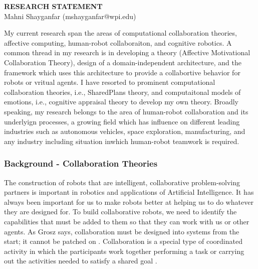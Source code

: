 \documentclass[a4paper, 10pt]{article}
\begin{document}
\thispagestyle{fancy}

\lhead{}
\rhead{}

\renewcommand{\headrulewidth}{0pt} 
\renewcommand{\footrulewidth}{0pt} 

\pagestyle{fancy}

\rhead{\textcolor{gray}{\thepage/\totalpages{}}}

\begin{small}

\begin{center}
{\LARGE \bf RESEARCH STATEMENT}\\
\vspace*{0.1cm}
{\normalsize Mahni Shayganfar (mshayganfar@wpi.edu)}
\end{center}

My current research span the areas of computational collaboration theories,
affective computing, human-robot collaboraiton, and cognitive robotics. A
common thread in my research is in developing a theory (Affective Motivational
Collaboration Theory), design of a domain-independent architecture, and the
framework which uses this architecture to provide a collabortive behavior for
robots or vritual agents. I have resorted to prominent computational
collaboration theories, i.e., SharedPlans theory, and computaitonal models of
emotions, i.e., cognitive appraisal theory to develop my own theory. Broadly
speaking, my research belongs to the area of human-robot collaboration and its
underlyign processes, a growing field which has influence on different leading
industries such as autonomous vehicles, space exploration, manufacturing, and
any industry including situation inwhich human-robot teamwork is required.

\subsubsection*{Background - Collaboration Theories}

The construction of robots that are intelligent, collaborative problem-solving
partners is important in robotics and applications of Artificial Intelligence.
It has always been important for us to make robots better at helping us to do
whatever they are designed for. To build collaborative robots, we need to
identify the capabilities that must be added to them so that they can work with
us or other agents. As Grosz says, collaboration must be designed into systems
from the start; it cannot be patched on \cite{grosz:collaborative-systems}.
Collaboration is a special type of coordinated activity in which the
participants work together performing a task or carrying out the activities
needed to satisfy a shared goal \cite{grosz:collaboration}. 


\end{small}
\end{document}
